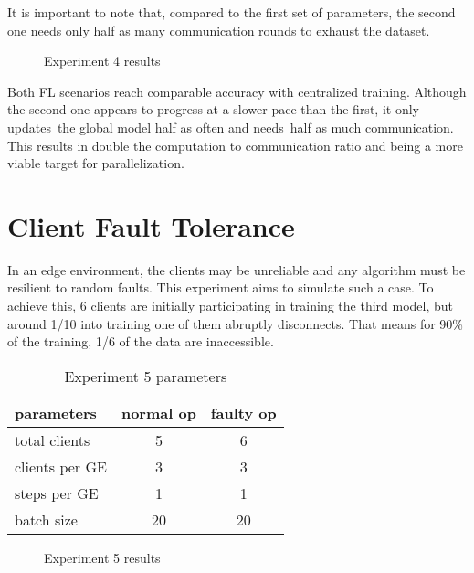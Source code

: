 It is important to note that, compared to the first set of parameters, the second one needs only half as many communication rounds to exhaust the dataset.
    
\begin{figure}[H]
    \center
    
    \caption[Experiment 4 results]{Experiment 4 results}
    \label{fig:Experiment 4 results}
\end{figure}

Both FL scenarios reach comparable accuracy with centralized training. Although the second one appears to progress at a slower pace than the first, it only updates the global model half as often and needs half as much communication. This results in double the computation to communication ratio and being a more viable target for parallelization.

\section{Client Fault Tolerance}
In an edge environment, the clients may be unreliable and any algorithm must be resilient to random faults. This experiment aims to simulate such a case. To achieve this, 6 clients are initially participating in training the third model, but around 1/10 into training one of them abruptly disconnects. That means for 90\% of the training, 1/6 of the data are inaccessible.

\begin{table}[H]
    \center
    \begin{tabular}
        { | l | c | c | }
        \hline
        parameters & normal op & faulty op\\\hline
        total clients   & 5 & 6\\\hline
        clients per GE  & 3 & 3\\\hline
        steps per GE    & 1 & 1\\\hline
        batch size      & 20 & 20\\\hline
    \end{tabular}
    \caption[Experiment 5 parameters]{Experiment 5 parameters}
    \label{table:Experiment 5 parameters}
\end{table}
    
\begin{figure}[H]
    \center
    
    \caption[Experiment 5 results]{Experiment 5 results}
    \label{fig:Experiment 5 results}
\end{figure}

